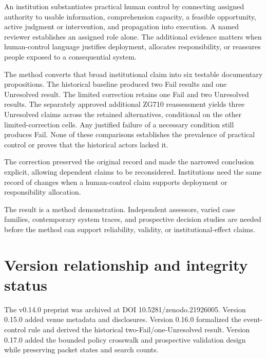 \documentclass[11pt]{article}
\begin{document}
An institution substantiates practical human control by connecting assigned authority to usable information, comprehension capacity, a feasible opportunity, active judgment or intervention, and propagation into execution. A named reviewer establishes an assigned role alone. The additional evidence matters when human-control language justifies deployment, allocates responsibility, or reassures people exposed to a consequential system.

The method converts that broad institutional claim into six testable documentary propositions. The historical baseline produced two Fail results and one Unresolved result. The limited correction retains one Fail and two Unresolved results. The separately approved additional ZG710 reassessment yields three Unresolved claims across the retained alternatives, conditional on the other limited-correction cells. Any justified failure of a necessary condition still produces Fail. None of these comparisons establishes the prevalence of practical control or proves that the historical actors lacked it.

The correction preserved the original record and made the narrowed conclusion explicit, allowing dependent claims to be reconsidered. Institutions need the same record of changes when a human-control claim supports deployment or responsibility allocation.

The result is a method demonstration. Independent assessors, varied case families, contemporary system traces, and prospective decision studies are needed before the method can support reliability, validity, or institutional-effect claims.

\section*{Version relationship and integrity status}

The v0.14.0 preprint was archived at DOI 10.5281/zenodo.21926005. Version 0.15.0 added venue metadata and disclosures. Version 0.16.0 formalized the event-control rule and derived the historical two-Fail/one-Unresolved result. Version 0.17.0 added the bounded policy crosswalk and prospective validation design while preserving packet states and search counts.
\end{document}
